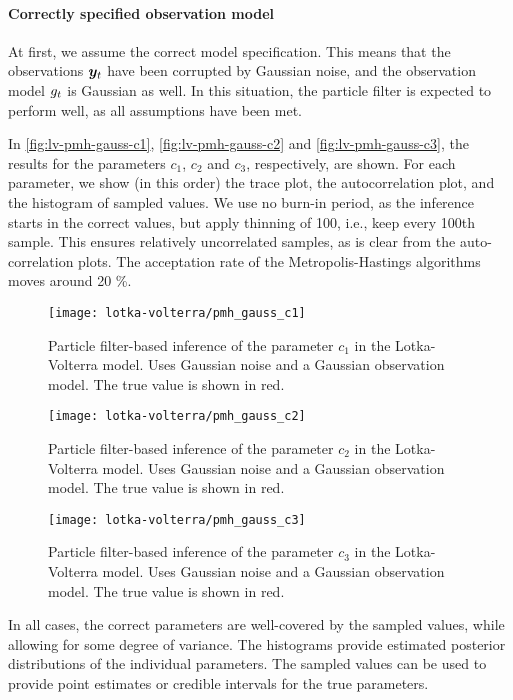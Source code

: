 \paragraph{Correctly specified observation model}
At first, we assume the correct model specification. This means that the observations $\bm{y}_t$ have been corrupted by Gaussian noise, and the observation model $g_t$ is Gaussian as well. In this situation, the particle filter is expected to perform well, as all assumptions have been met.

In \autoref{fig:lv-pmh-gauss-c1}, \autoref{fig:lv-pmh-gauss-c2} and \autoref{fig:lv-pmh-gauss-c3}, the results for the parameters $c_1$, $c_2$ and $c_3$, respectively, are shown. For each parameter, we show (in this order) the trace plot, the autocorrelation plot, and the histogram of sampled values. We use no burn-in period, as the inference starts in the correct values, but apply thinning of 100, i.e., keep every 100th sample. This ensures relatively uncorrelated samples, as is clear from the auto-correlation plots. The acceptation rate of the Metropolis-Hastings algorithms moves around 20 \%.

\begin{figure}[htp]
    \centering
    \texttt{[image: lotka-volterra/pmh\_gauss\_c1]}
    \caption{Particle filter-based inference of the parameter $c_1$ in the Lotka-Volterra model. Uses Gaussian noise and a Gaussian observation model. The true value is shown in red.}
    \label{fig:lv-pmh-gauss-c1}
\end{figure}

\begin{figure}[htp]
    \centering
    \texttt{[image: lotka-volterra/pmh\_gauss\_c2]}
    \caption{Particle filter-based inference of the parameter $c_2$ in the Lotka-Volterra model. Uses Gaussian noise and a Gaussian observation model. The true value is shown in red.}
    \label{fig:lv-pmh-gauss-c2}
\end{figure}

\begin{figure}[htp]
    \centering
    \texttt{[image: lotka-volterra/pmh\_gauss\_c3]}
    \caption{Particle filter-based inference of the parameter $c_3$ in the Lotka-Volterra model. Uses Gaussian noise and a Gaussian observation model. The true value is shown in red.}
    \label{fig:lv-pmh-gauss-c3}
\end{figure}

In all cases, the correct parameters are well-covered by the sampled values, while allowing for some degree of variance. The histograms provide estimated posterior distributions of the individual parameters. The sampled values can be used to provide point estimates or credible intervals for the true parameters.

